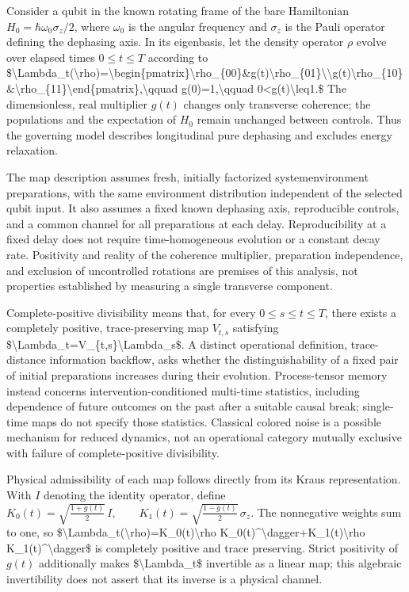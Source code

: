 \documentclass[11pt]{article}
\begin{document}
Consider a qubit in the known rotating frame of the bare Hamiltonian $H_0=\hbar\omega_0\sigma_z/2$, where $\omega_0$ is the angular frequency and $\sigma_z$ is the Pauli operator defining the dephasing axis. In its eigenbasis, let the density operator $\rho$ evolve over elapsed times $0\leq t\leq T$ according to
\$\textbackslash{}Lambda\_t(\textbackslash{}rho)=\textbackslash{}begin\{pmatrix\}\textbackslash{}rho\_\{00\}\&g(t)\textbackslash{}rho\_\{01\}\textbackslash{}\textbackslash{}g(t)\textbackslash{}rho\_\{10\}\&\textbackslash{}rho\_\{11\}\textbackslash{}end\{pmatrix\},\textbackslash{}qquad g(0)=1,\textbackslash{}qquad 0\textless{}g(t)\textbackslash{}leq1.\$
The dimensionless, real multiplier $g(t)$ changes only transverse coherence; the populations and the expectation of $H_0$ remain unchanged between controls. Thus the governing model describes longitudinal pure dephasing and excludes energy relaxation.

The map description assumes fresh, initially factorized system\textendash{}environment preparations, with the same environment distribution independent of the selected qubit input. It also assumes a fixed known dephasing axis, reproducible controls, and a common channel for all preparations at each delay. Reproducibility at a fixed delay does not require time-homogeneous evolution or a constant decay rate. Positivity and reality of the coherence multiplier, preparation independence, and exclusion of uncontrolled rotations are premises of this analysis, not properties established by measuring a single transverse component.

Complete-positive divisibility means that, for every $0\leq s\leq t\leq T$, there exists a completely positive, trace-preserving map $V_{t,s}$ satisfying \$\textbackslash{}Lambda\_t=V\_\{t,s\}\textbackslash{}Lambda\_s\$. A distinct operational definition, trace-distance information backflow, asks whether the distinguishability of a fixed pair of initial preparations increases during their evolution. Process-tensor memory instead concerns intervention-conditioned multi-time statistics, including dependence of future outcomes on the past after a suitable causal break; single-time maps do not specify those statistics. Classical colored noise is a possible mechanism for reduced dynamics, not an operational category mutually exclusive with failure of complete-positive divisibility.

Physical admissibility of each map follows directly from its Kraus representation. With $I$ denoting the identity operator, define
$K_0(t)=\sqrt{\frac{1+g(t)}{2}}\,I,\qquad K_1(t)=\sqrt{\frac{1-g(t)}{2}}\,\sigma_z.$
The nonnegative weights sum to one, so \$\textbackslash{}Lambda\_t(\textbackslash{}rho)=K\_0(t)\textbackslash{}rho K\_0(t)\textasciicircum{}\textbackslash{}dagger+K\_1(t)\textbackslash{}rho K\_1(t)\textasciicircum{}\textbackslash{}dagger\$ is completely positive and trace preserving. Strict positivity of $g(t)$ additionally makes \$\textbackslash{}Lambda\_t\$ invertible as a linear map; this algebraic invertibility does not assert that its inverse is a physical channel.
\end{document}

